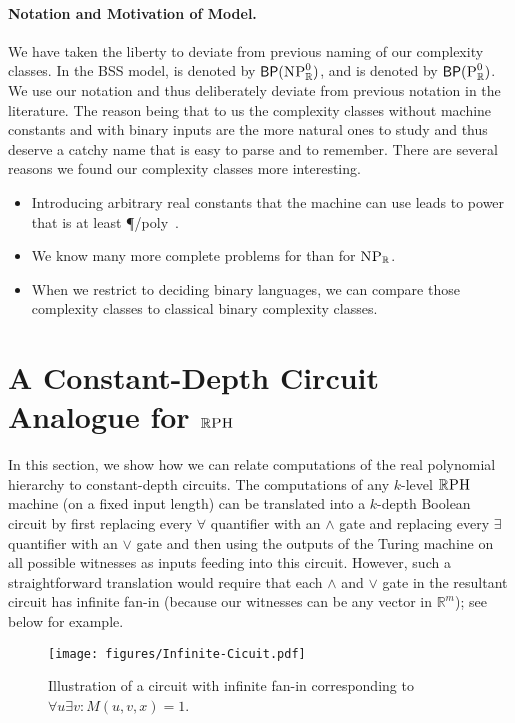 \documentclass{article}
\begin{document}
\paragraph{Notation and Motivation of Model.}
    We have taken the liberty to deviate from previous naming of our complexity classes.
    In the BSS model, \ER is denoted by $\mathsf{BP}(\textsc{NP}^0_\mathbb{R})$,
    and \PR is denoted by $\mathsf{BP}(\textsc{P}^0_\mathbb{R})$.
    We use our notation and thus deliberately deviate from previous
    notation in the literature.
    The reason being that to us the complexity classes without machine constants and with binary inputs are the more natural ones to study and thus deserve a catchy name that is easy to parse and to remember.
% 
    There are several reasons we found our complexity classes more interesting. 
    \begin{itemize}
        \item Introducing arbitrary real constants that the machine can use leads to power that is at least \P/poly~\cite{Koiran94}.
        \item We know many more complete problems for \ER than for $\textsc{NP}_\mathbb{R}$.
        \item When we restrict to deciding binary languages, we can compare those complexity classes to classical binary complexity classes. 
    \end{itemize}

\section{A Constant-Depth Circuit Analogue for $\mathbb{R}\textsc{PH}$}
\label{sec:ACanalogueForRPH}

In this section, we show how we can relate computations of the real polynomial hierarchy to constant-depth circuits. The computations of any $k$-level $\mathbb{R}\textsc{PH}$ machine (on a fixed input length) can be translated into a $k$-depth Boolean circuit by first replacing every $\forall$ quantifier with an $\land$ gate and replacing every $\exists$ quantifier with an $\lor$ gate and then using the outputs of the Turing machine on all possible witnesses as inputs feeding into this circuit. 
However, such a straightforward translation would require that each $\land$ and $\lor$ gate in the resultant circuit has infinite fan-in (because our witnesses can be any vector in $\mathbb{R}^m$); see  below for example.

\begin{figure}[h]
\centering
    \texttt{[image: figures/Infinite-Cicuit.pdf]}
    \caption{Illustration of a circuit with infinite fan-in corresponding to $\forall u \exists v : M(u,v,x) = 1$.}
\label{fig:IllustrationSimple}
\end{figure}
\end{document}
